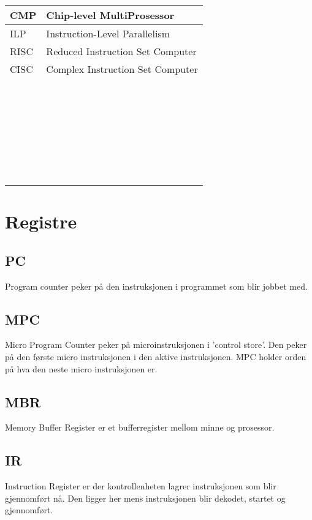 \documentclass[a4paper, 10pt]{article}
\begin{document}
\begin{tabular}{|l|l|}
    CMP         & Chip-level MultiProsessor        \\ \hline
    ILP         & Instruction-Level Parallelism    \\ \hline
    RISC        & Reduced Instruction Set Computer \\ \hline
    CISC        & Complex Instruction Set Computer \\ \hline
    ~           & ~                                \\ \hline
    ~           & ~                                \\ \hline
    ~           & ~                                \\ \hline
    ~           & ~                                \\ \hline
    ~           & ~                                \\ \hline
    ~           & ~                                \\ \hline
    \end{tabular}
\newpage    
   
\section{Registre}
\subsection{PC}
Program counter peker på den instruksjonen i programmet som blir jobbet med.

\subsection{MPC}
Micro Program Counter peker på microinstruksjonen i 'control store'.  Den peker på den første micro instruksjonen i den aktive instruksjonen. MPC holder orden på hva den neste micro instruksjonen er.

\subsection{MBR}
Memory Buffer Register er et bufferregister mellom minne og prosessor.

\subsection{IR}
Instruction Register er der kontrollenheten lagrer instruksjonen som blir gjennomført nå. Den ligger her mens instruksjonen blir dekodet, startet og gjennomført.
\end{document}
